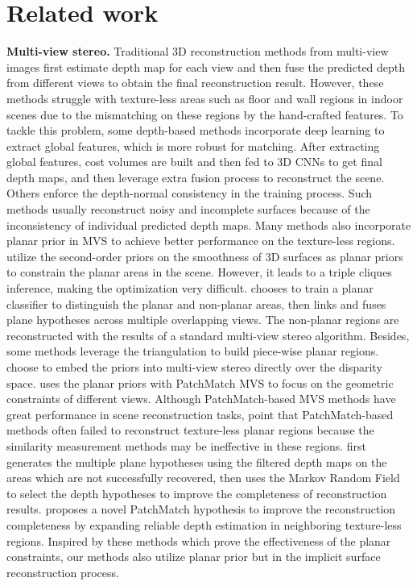 \documentclass[10pt,journal,compsoc]{IEEEtran}
\begin{document}
	\section{Related work}
	\label{sec:related_work}
	
	\noindent\textbf{Multi-view stereo.} Traditional 3D reconstruction methods from multi-view images \cite{bleyer2011patchmatch, merrell2007real, schonberger2016pixelwise, newcombe2011kinectfusion, schonberger2016structure, shotton2013scene} first estimate depth map for each view and then fuse the predicted depth from different views to obtain the final reconstruction result. However, these methods struggle with texture-less areas such as floor and wall regions in indoor scenes due to the mismatching on these regions by the hand-crafted features. To tackle this problem, some depth-based methods \cite{im2019dpsnet,yao2018mvsnet,yao2019recurrent, cheng2020deep} incorporate deep learning to extract global features, which is more robust for matching. After extracting global features, cost volumes are built and then fed to 3D CNNs to get final depth maps, and then leverage extra fusion process to reconstruct the scene. Others \cite{yin2019enforcing,kusupati2020normal} enforce the depth-normal consistency in the training process. Such methods usually reconstruct noisy and incomplete surfaces because of the inconsistency of individual predicted depth maps. Many methods also incorporate planar prior in MVS to achieve better performance on the texture-less regions. \cite{woodford2009global, gennert1988brightness} utilize the second-order priors on the smoothness of 3D surfaces as planar priors to constrain the planar areas in the scene. However, it leads to a triple cliques inference, making the optimization very difficult. \cite{gallup2010piecewise} chooses to train a planar classifier to distinguish the planar and non-planar areas, then links and fuses plane hypotheses across multiple overlapping views. The non-planar regions are reconstructed with the results of a standard multi-view stereo algorithm. Besides, some methods \cite{geiger2010efficient, xu2020planar} leverage the triangulation to build piece-wise planar regions. \cite{geiger2010efficient} choose to embed the priors into multi-view stereo directly over the disparity space. \cite{xu2020planar} uses the planar priors with PatchMatch MVS to focus on the geometric constraints of different views. Although PatchMatch-based MVS methods have great performance in scene reconstruction tasks, \cite{sun2021phi, romanoni2019tapa} point that PatchMatch-based methods often failed to reconstruct texture-less planar regions because the similarity measurement methods may be ineffective in these regions. \cite{sun2021phi} first generates the multiple plane hypotheses using the filtered depth maps on the areas which are not successfully recovered, then uses the Markov Random Field to select the depth hypotheses to improve the completeness of reconstruction results. \cite{romanoni2019tapa} proposes a novel PatchMatch hypothesis to improve the reconstruction completeness by expanding reliable depth estimation in neighboring texture-less regions. Inspired by these methods which prove the effectiveness of the planar constraints, our methods also utilize planar prior but in the implicit surface reconstruction process.
	
\end{document}
